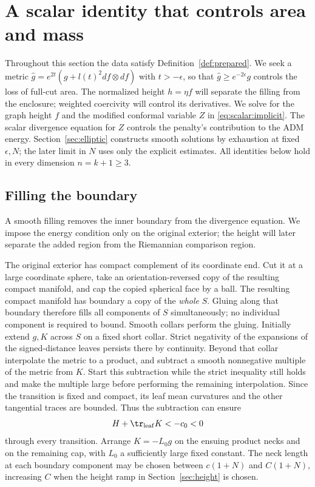 \section{A scalar identity that controls area and mass}
\label{sec:scalar}
\label{sec:scalar:construction}

Throughout this section the data satisfy Definition~\ref{def:prepared}.  We seek a metric
$\widehat g=e^{2t}(g+l(t)^2df\otimes df)$ with
$t>-\epsilon$, so that $\widehat g\ge e^{-2\epsilon}g$ controls
the loss of full-cut area.  The normalized height $h=\eta f$ will
separate the filling from the enclosure; weighted coercivity will
control its derivatives.  We solve for the graph height $f$ and the
modified conformal variable $Z$ in \eqref{eq:scalar:implicit}.
The scalar divergence equation for $Z$ controls the penalty's
contribution to the ADM energy.  Section~\ref{sec:elliptic} constructs
smooth solutions by exhaustion at fixed $\epsilon,N$; the later limit
in $N$ uses only the explicit estimates.  All identities below hold
in every dimension $n=k+1\geq3$.

\subsection{Filling the boundary}\label{subsec:scalar:filling}

A smooth filling removes the inner boundary from the divergence
equation.  We impose the energy condition only on the original exterior;
the height will later separate the added region from the Riemannian
comparison region.


The original exterior has compact complement of its coordinate end.
Cut it at a large coordinate sphere, take an orientation-reversed copy
of the resulting compact manifold, and cap the copied spherical face by
a ball.  The resulting compact manifold has boundary a copy of the
\emph{whole} $S$.  Gluing along that boundary therefore fills all
components of $S$ simultaneously; no individual component is required
to bound.  Smooth collars perform the gluing.  Initially extend $g,K$
across $S$ on a fixed short collar.  Strict negativity of the expansions
of the signed-distance leaves persists there by continuity.  Beyond
that collar interpolate the metric to a product, and subtract a smooth
nonnegative multiple of the metric from $K$.  Start this subtraction
while the strict inequality still holds and make the multiple large
before performing the remaining interpolation.  Since the transition
is fixed and compact, its leaf mean curvatures and the other tangential
traces are bounded.  Thus the subtraction can ensure
\[
 H+\tr_{\mathrm{leaf}}K<-c_0<0
\]
through every transition.  Arrange $K=-L_0g$ on the ensuing product
necks and on the remaining cap, with $L_0$ a sufficiently large fixed
constant.  The neck length at each boundary component may be chosen
between $c(1+N)$ and $C(1+N)$, increasing $C$ when the height ramp in
Section~\ref{sec:height} is chosen.

